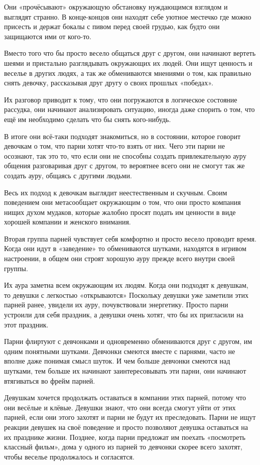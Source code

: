 Они «прочёсывают» окружающую обстановку нуждающимся взглядом и выглядят странно. В конце-концов они находят себе уютное местечко где можно присесть и держат бокалы с пивом перед своей грудью, как будто они защищаются ими от кого-то.

Вместо того что бы просто весело общаться друг с другом, они начинают вертеть шеями и пристально разглядывать окружающих их людей. Они ищут ценность и веселье в других людях, а так же обмениваются мнениями о том, как правильно снять девочку, рассказывая друг другу о своих прошлых «победах».

Их разговор приводит к тому, что они погружаются в логическое состояние рассудка, они начинают анализировать ситуацию, иногда даже спорить о том, что ещё им необходимо сделать что бы снять кого-нибудь.

В итоге они всё-таки подходят знакомиться, но в состоянии, которое говорит девочкам о том, что парни хотят что-то взять от них. Чего эти парни не осознают, так это то, что если они не способны создать привлекательную ауру общения разговаривая друг с другом, то вероятнее всего они не смогут так же создать ауру, общаясь с другими людьми.

Весь их подход к девочкам выглядит неестественным и скучным. Своим поведением они метасообщает окружающим о том, что они просто компания нищих духом мудаков, которые жалобно просят подать им ценности в виде хорошей компании и женского внимания.

Вторая группа парней чувствует себя комфортно и просто весело проводит время. Когда они идут в «заведение» то обмениваются шутками, находятся в игривом настроении, в общем они строят хорошую ауру прежде всего внутри своей группы.

Их аура заметна всем окружающим их людям. Когда они подходят к девушкам, то девушки с легкостью «открываются» Поскольку девушки уже заметили этих парней ранее, увидели их ауру, почувствовали энергетику. Просто парни устроили для себя праздник, а девушки очень хотят, что бы их пригласили на этот праздник.

Парни флиртуют с девчонками и одновременно обмениваются друг с другом, им одним понятными шутками. Девчонки смеются вместе с парнями, часто не вполне даже понимая смысл шуток. И чем больше девчонки смеются над шутками, тем больше их начинают заинтересовывать эти парни, они начинают втягиваться во фрейм парней.

Девушкам хочется продолжать оставаться в компании этих парней, потому что они весёлые и клёвые. Девушки знают, что они всегда смогут уйти от этих парней, если они этого захотят и парни не будут их преследовать. Парни не ищут реакции девушек на своё поведение и просто позволяют девушка оставаться на их празднике жизни. Позднее, когда парни предложат им поехать «посмотреть классный фильм», дома у одного из парней то девчонки скорее всего захотят, чтобы веселье продолжалось и согласятся.
